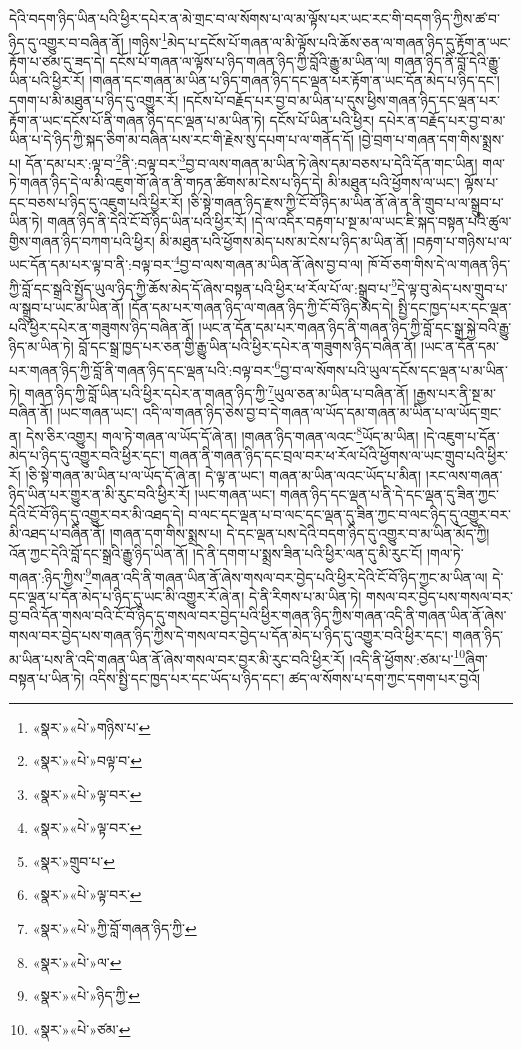 དེའི་བདག་ཉིད་ཡིན་པའི་ཕྱིར་དཔེར་ན་མེ་གྲང་བ་ལ་སོགས་པ་ལ་མ་ལྟོས་པར་ཡང་རང་གི་བདག་ཉིད་ཀྱིས་ཚ་བ་ཉིད་དུ་འགྱུར་བ་བཞིན་ནོ། །གཉིས་\footnote{«སྣར་»«པེ་»གཉིས་པ་}མེད་པ་དངོས་པོ་གཞན་ལ་མི་ལྟོས་པའི་ཆོས་ཅན་ལ་གཞན་ཉིད་དུ་རྟོག་ན་ཡང་རྟོག་པ་ཙམ་དུ་ཟད་དེ། དངོས་པོ་གཞན་ལ་ལྟོས་པ་ཉིད་གཞན་ཉིད་ཀྱི་བློའི་རྒྱུ་མ་ཡིན་ལ། གཞན་ཉིད་ནི་བློ་དེའི་རྒྱུ་ཡིན་པའི་ཕྱིར་རོ། །གཞན་དང་གཞན་མ་ཡིན་པ་ཉིད་གཞན་ཉིད་དང་ལྡན་པར་རྟོག་ན་ཡང་དོན་མེད་པ་ཉིད་དང་། དགག་པ་མི་མཐུན་པ་ཉིད་དུ་འགྱུར་རོ། །དངོས་པོ་བརྗོད་པར་བྱ་བ་མ་ཡིན་པ་དུས་ཕྱིས་གཞན་ཉིད་དང་ལྡན་པར་རྟོག་ན་ཡང་དངོས་པོ་ནི་གཞན་ཉིད་དང་ལྡན་པ་མ་ཡིན་ཏེ། དངོས་པོ་ཡིན་པའི་ཕྱིར། དཔེར་ན་བརྗོད་པར་བྱ་བ་མ་ཡིན་པ་དེ་ཉིད་ཀྱི་སྐད་ཅིག་མ་བཞིན་པས་རང་གི་རྗེས་སུ་དཔག་པ་ལ་གནོད་དོ། །བྱེ་བྲག་པ་གཞན་དག་གིས་སྨྲས་པ། དོན་དམ་པར་:ལྟ་བ་\footnote{«སྣར་»«པེ་»བལྟ་བ་}ནི་:བལྟ་བར་\footnote{«སྣར་»«པེ་»ལྟ་བར་}བྱ་བ་ལས་གཞན་མ་ཡིན་ཏེ་ཞེས་དམ་བཅས་པ་དེའི་དོན་གང་ཡིན། གལ་ཏེ་གཞན་ཉིད་དེ་ལ་མི་འཇུག་གོ་ཞེ་ན་ནི་གཏན་ཚིགས་མ་ངེས་པ་ཉིད་དེ། མི་མཐུན་པའི་ཕྱོགས་ལ་ཡང་། ལྟོས་པ་དང་བཅས་པ་ཉིད་དུ་འཇུག་པའི་ཕྱིར་རོ། །ཅི་སྟེ་གཞན་ཉིད་རྫས་ཀྱི་ངོ་བོ་ཉིད་མ་ཡིན་ནོ་ཞེ་ན་ནི་གྲུབ་པ་ལ་སྒྲུབ་པ་ཡིན་ཏེ། གཞན་ཉིད་ནི་དེའི་ངོ་བོ་ཉིད་ཡིན་པའི་ཕྱིར་རོ། །དེ་ལ་འདིར་བརྟག་པ་སྔ་མ་ལ་ཡང་ཇི་སྐད་བསྟན་པའི་ཚུལ་གྱིས་གཞན་ཉིད་བཀག་པའི་ཕྱིར། མི་མཐུན་པའི་ཕྱོགས་མེད་པས་མ་ངེས་པ་ཉིད་མ་ཡིན་ནོ། །བརྟག་པ་གཉིས་པ་ལ་ཡང་དོན་དམ་པར་ལྟ་བ་ནི་:བལྟ་བར་\footnote{«སྣར་»«པེ་»ལྟ་བར་}བྱ་བ་ལས་གཞན་མ་ཡིན་ནོ་ཞེས་བྱ་བ་ལ། ཁོ་བོ་ཅག་གིས་དེ་ལ་གཞན་ཉིད་ཀྱི་བློ་དང་སྒྲའི་སྤྱོད་ཡུལ་ཉིད་ཀྱི་ཆོས་མེད་དོ་ཞེས་བསྟན་པའི་ཕྱིར་ཕ་རོལ་པོ་ལ་:སྒྲུབ་པ་\footnote{«སྣར་»གྲུབ་པ་}དེ་ལྟ་བུ་མེད་པས་གྲུབ་པ་ལ་སྒྲུབ་པ་ཡང་མ་ཡིན་ནོ། །དོན་དམ་པར་གཞན་ཉིད་ལ་གཞན་ཉིད་ཀྱི་ངོ་བོ་ཉིད་མེད་དེ། སྤྱི་དང་ཁྱད་པར་དང་ལྡན་པའི་ཕྱིར་དཔེར་ན་གཟུགས་ཉིད་བཞིན་ནོ། །ཡང་ན་དོན་དམ་པར་གཞན་ཉིད་ནི་གཞན་ཉིད་ཀྱི་བློ་དང་སྒྲ་སྐྱེ་བའི་རྒྱུ་ཉིད་མ་ཡིན་ཏེ། བློ་དང་སྒྲ་ཁྱད་པར་ཅན་གྱི་རྒྱུ་ཡིན་པའི་ཕྱིར་དཔེར་ན་གཟུགས་ཉིད་བཞིན་ནོ། །ཡང་ན་དོན་དམ་པར་གཞན་ཉིད་ཀྱི་བློ་ནི་གཞན་ཉིད་དང་ལྡན་པའི་:བལྟ་བར་\footnote{«སྣར་»«པེ་»ལྟ་བར་}བྱ་བ་ལ་སོགས་པའི་ཡུལ་དངོས་དང་ལྡན་པ་མ་ཡིན་ཏེ། གཞན་ཉིད་ཀྱི་བློ་ཡིན་པའི་ཕྱིར་དཔེར་ན་གཞན་ཉིད་ཀྱི་\footnote{«སྣར་»«པེ་»ཀྱི་བློ་གཞན་ཉིད་ཀྱི་}ཡུལ་ཅན་མ་ཡིན་པ་བཞིན་ནོ། །རྒྱས་པར་ནི་སྔ་མ་བཞིན་ནོ། །ཡང་གཞན་ཡང་། འདི་ལ་གཞན་ཉིད་ཅེས་བྱ་བ་དེ་གཞན་ལ་ཡོད་དམ་གཞན་མ་ཡིན་པ་ལ་ཡོད་གྲང་ན། དེས་ཅིར་འགྱུར། གལ་ཏེ་གཞན་ལ་ཡོད་དོ་ཞེ་ན། །གཞན་ཉིད་གཞན་ལའང་\footnote{«སྣར་»«པེ་»ལ་}ཡོད་མ་ཡིན། །དེ་འཇུག་པ་དོན་མེད་པ་ཉིད་དུ་འགྱུར་བའི་ཕྱིར་དང་། གཞན་ནི་གཞན་ཉིད་དང་བྲལ་བར་ཕ་རོལ་པོའི་ཕྱོགས་ལ་ཡང་གྲུབ་པའི་ཕྱིར་རོ། །ཅི་སྟེ་གཞན་མ་ཡིན་པ་ལ་ཡོད་དོ་ཞེ་ན། དེ་ལྟ་ན་ཡང་། གཞན་མ་ཡིན་ལའང་ཡོད་པ་མིན། །རང་ལས་གཞན་ཉིད་ཡིན་པར་གྱུར་ན་མི་རུང་བའི་ཕྱིར་རོ། །ཡང་གཞན་ཡང་། གཞན་ཉིད་དང་ལྡན་པ་ནི་དེ་དང་ལྡན་དུ་ཟིན་ཀྱང་དེའི་ངོ་བོ་ཉིད་དུ་འགྱུར་བར་མི་འཐད་དེ། བ་ལང་དང་ལྡན་པ་བ་ལང་དང་ལྡན་དུ་ཟིན་ཀྱང་བ་ལང་ཉིད་དུ་འགྱུར་བར་མི་འཐད་པ་བཞིན་ནོ། །གཞན་དག་གིས་སྨྲས་པ། དེ་དང་ལྡན་པས་དེའི་བདག་ཉིད་དུ་འགྱུར་བ་མ་ཡིན་མོད་ཀྱི། འོན་ཀྱང་དེའི་བློ་དང་སྒྲའི་རྒྱུ་ཉིད་ཡིན་ནོ། །དེ་ནི་དགག་པ་སྨྲས་ཟིན་པའི་ཕྱིར་ལན་དུ་མི་རུང་ངོ། །གལ་ཏེ་གཞན་:ཉིད་ཀྱིས་\footnote{«སྣར་»«པེ་»ཉིད་ཀྱི་}གཞན་འདི་ནི་གཞན་ཡིན་ནོ་ཞེས་གསལ་བར་བྱེད་པའི་ཕྱིར་དེའི་ངོ་བོ་ཉིད་ཀྱང་མ་ཡིན་ལ། དེ་དང་ལྡན་པ་དོན་མེད་པ་ཉིད་དུ་ཡང་མི་འགྱུར་རོ་ཞེ་ན། དེ་ནི་རིགས་པ་མ་ཡིན་ཏེ། གསལ་བར་བྱེད་པས་གསལ་བར་བྱ་བའི་དོན་གསལ་བའི་ངོ་བོ་ཉིད་དུ་གསལ་བར་བྱེད་པའི་ཕྱིར་གཞན་ཉིད་ཀྱིས་གཞན་འདི་ནི་གཞན་ཡིན་ནོ་ཞེས་གསལ་བར་བྱེད་པས་གཞན་ཉིད་ཀྱིས་དེ་གསལ་བར་བྱེད་པ་དོན་མེད་པ་ཉིད་དུ་འགྱུར་བའི་ཕྱིར་དང་། གཞན་ཉིད་མ་ཡིན་པས་ནི་འདི་གཞན་ཡིན་ནོ་ཞེས་གསལ་བར་བྱར་མི་རུང་བའི་ཕྱིར་རོ། །འདི་ནི་ཕྱོགས་:ཙམ་པ་\footnote{«སྣར་»«པེ་»ཙམ་}ཞིག་བསྟན་པ་ཡིན་ཏེ། འདིས་སྤྱི་དང་ཁྱད་པར་དང་ཡོད་པ་ཉིད་དང་། ཚད་ལ་སོགས་པ་དག་ཀྱང་དགག་པར་བྱའོ། 
